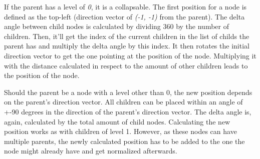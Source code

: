 If the parent has a level of \emph{0}, it is a collapsable. The first position for a node is defined as the top-left (direction vector of \emph{(-1, -1)} from the parent). The delta angle between child nodes is calculated by dividing 360 by the number of children. Then, it'll get the index of the current children in the list of childs the parent has and multiply the delta angle by this index. It then rotates the initial direction vector to get the one pointing at the position of the node. Multiplying it with the distance calculated in respect to the amount of other children leads to the position of the node.

Should the parent be a node with a level other than 0, the new position depends on the parent's direction vector. All children can be placed within an angle of +-90 degrees in the direction of the parent's direction vector. The delta angle is, again, calculated by the total amount of child nodes. Calculating the new position works as with children of level 1. However, as these nodes can have multiple parents, the newly calculated position has to be added to the one the node might already have and get normalized afterwards. \\

